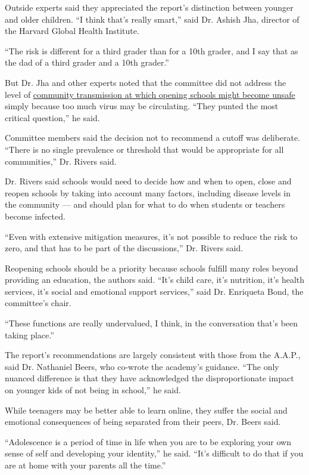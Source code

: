 Outside experts said they appreciated the report's distinction between
younger and older children. ``I think that's really smart,'' said Dr.
Ashish Jha, director of the Harvard Global Health Institute.

``The risk is different for a third grader than for a 10th grader, and I
say that as the dad of a third grader and a 10th grader.''

But Dr. Jha and other experts noted that the committee did not address
the level of
\href{https://www.nytimes.com/2020/07/14/us/coronavirus-schools-fall.html}{community
transmission at which opening schools might become unsafe} simply
because too much virus may be circulating. ``They punted the most
critical question,'' he said.

Committee members said the decision not to recommend a cutoff was
deliberate. ``There is no single prevalence or threshold that would be
appropriate for all communities,'' Dr. Rivers said.

Dr. Rivers said schools would need to decide how and when to open, close
and reopen schools by taking into account many factors, including
disease levels in the community --- and should plan for what to do when
students or teachers become infected.

``Even with extensive mitigation measures, it's not possible to reduce
the risk to zero, and that has to be part of the discussions,'' Dr.
Rivers said.

Reopening schools should be a priority because schools fulfill many
roles beyond providing an education, the authors said. ``It's child
care, it's nutrition, it's health services, it's social and emotional
support services,'' said Dr. Enriqueta Bond, the committee's chair.

``These functions are really undervalued, I think, in the conversation
that's been taking place.''

The report's recommendations are largely consistent with those from the
A.A.P., said Dr. Nathaniel Beers, who co-wrote the academy's guidance.
``The only nuanced difference is that they have acknowledged the
disproportionate impact on younger kids of not being in school,'' he
said.

While teenagers may be better able to learn online, they suffer the
social and emotional consequences of being separated from their peers,
Dr. Beers said.

``Adolescence is a period of time in life when you are to be exploring
your own sense of self and developing your identity,'' he said. ``It's
difficult to do that if you are at home with your parents all the
time.''

